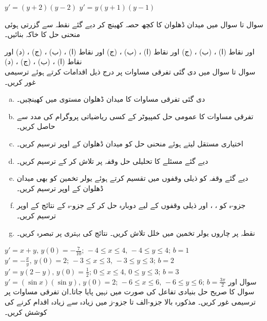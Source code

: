$y'=(y+2)(y-2)$
$y'=y(y+1)(y-1)$

سوال  تا سوال  میں میدان ڈھلوان کا کچھ حصہ کھینچ کر دیے گئے نقطہ سے گزرتی ہوئی منحنی حل کا خاکہ بنائیں۔
 
 اور نقاط (ا) ، (ب) ، (ج) 
 اور نقاط (ا) ، (ب) ، (ج) 
 اور نقاط (ا) ، (ب) ، (ج) ، (د) 
 اور نقاط (ا) ، (ب) ، (ج) ، (د) 
\\
سوال  تا سوال  میں دی گئی تفرقی مساوات پر درج ذیل اقدامات کرتے ہوئے ترسیمی غور کریں۔
\begin{enumerate}[a.]
\item
دی گئی تفرقی مساوات کا میدان ڈھلوان مستوی   میں کھینچیں۔
\item
تفرقی مساوات کا عمومی حل کمپیوٹر کے کسی ریاضیاتی   پروگرام کی مدد سے حاصل کریں۔
\item
اختیاری مستقل  لیتے ہوئے منحنی حل کو میدان ڈھلوان کے اوپر ترسیم کریں۔
\item
دیے گئے مسئلے کا تحلیلی حل وقفہ  پر تلاش کر کے ترسیم کریں۔
\item
 دیے گئے وقفہ کو  ذیلی وقفوں میں تقسیم کرتے ہوئے یولر تخمین کو بھی میدان ڈھلوان کے اوپر ترسیم کریں۔
\item
 جزو-ہ کو ، ، اور  ذیلی وقفوں کے لیے دوبارہ حل کر کے جزو-ہ کے نتائج کے اوپر ترسیم کریں۔
\item
نقطہ  پر چاروں یولر تخمین میں خلل تلاش کریں۔ نتائج کی بہتری پر تبصرہ کریں۔
\end{enumerate}

$y'=x+y,\, y(0)=-\tfrac{7}{10};\, -4\le x\le 4,\, -4\le y\le 4;\, b=1$
$y'=-\tfrac{x}{y},\, y(0)=2;\, -3\le x\le 3,\, -3\le y\le 3;\, b=2$
$y'=y(2-y),\, y(0)=\tfrac{1}{2};\, 0\le x\le 4,\, 0\le y\le 3;\, b=3$
$y'=(\sin x)(\sin y),\, y(0)=2;\, -6\le x\le 6,\, -6\le y\le 6;\, b=\tfrac{3\pi}{2}$
سوال   اور سوال  کا  صریح حل   بنیادی تفاعل کی صورت میں نہیں پایا جاتا۔ان تفرقی مساوات پر ترسیمی غور کریں۔ مذکورہ بالا جزو-الف تا جزو-ز میں  زیادہ سے زیادہ  اقدام  کرنے کی کوشش کریں۔
 
